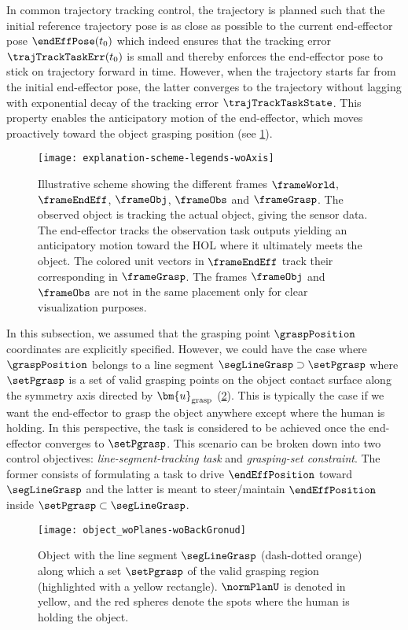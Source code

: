	In common trajectory tracking control, the trajectory is planned such that the initial reference trajectory pose is as close as possible to the current end-effector pose $\endEffPose(t_0)$ which indeed ensures that the tracking error $\trajTrackTaskErr(t_0)$ is small and thereby enforces the end-effector pose to stick on trajectory forward in time. However, when the trajectory starts far from the initial end-effector pose, the latter converges to the trajectory without lagging with exponential decay of the tracking error $\trajTrackTaskState$. This property enables the anticipatory motion of the end-effector, which moves proactively toward the object grasping position (see \cref{fig:robot and object}).
	\begin{figure}
		\centering
		\texttt{[image: explanation-scheme-legends-woAxis]}
		\caption{Illustrative scheme showing the different frames $\frameWorld$, $\frameEndEff$, $\frameObj$, $\frameObs$ and $\frameGrasp$. The observed object is tracking the actual object, giving the sensor data. The end-effector tracks the observation task outputs yielding an anticipatory motion toward the HOL where it ultimately meets the object. The colored unit vectors in $\frameEndEff$ track their corresponding in $\frameGrasp$. The frames $\frameObj$ and $\frameObs$ are not in the same placement only for clear visualization purposes.}
		\label{fig:robot and object}
	\end{figure}

In this subsection, we assumed that the grasping point $\graspPosition$ coordinates are explicitly specified. However, we could have the case where $\graspPosition$ belongs to a line segment $\segLineGrasp\supset\setPgrasp$ where $\setPgrasp$ is a set of valid grasping points on the object contact surface along the symmetry axis directed by $\bm{u}_{\rm grasp}$ (\cref{fig:object without planes}). This is typically the case if we want the end-effector to grasp the object anywhere except where the human is holding. In this perspective, the task is considered to be achieved once the end-effector converges to $\setPgrasp$. This scenario can be broken down into two control objectives:  \emph{line-segment-tracking task} and \emph{grasping-set constraint}. The former consists of formulating a task to drive  $\endEffPosition$ toward $\segLineGrasp$ and the latter is meant to steer/maintain  $\endEffPosition$ inside $\setPgrasp\subset\segLineGrasp$.
\begin{figure}
	\centering
	\texttt{[image: object\_woPlanes-woBackGronud]}
	\caption{Object with the line segment $\segLineGrasp$ (dash-dotted orange) along which a set $\setPgrasp$ of the valid grasping region (highlighted with a yellow rectangle). $\normPlanU$ is denoted in yellow, and the red spheres denote the spots where the human is holding the object.}
	\label{fig:object without planes}
\end{figure} 
